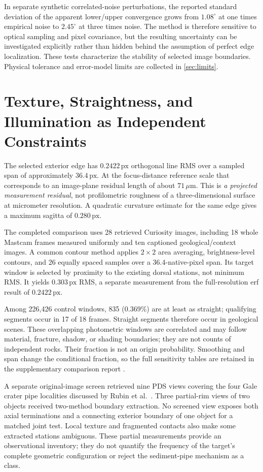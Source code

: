 \documentclass[11pt,letterpaper]{article}
\newcommand{\px}{\,\mathrm{px}}
\begin{document}
In separate synthetic correlated-noise perturbations, the reported standard deviation of the apparent lower/upper convergence grows from \(1.08^\circ\) at one times empirical noise to \(2.45^\circ\) at three times noise. The method is therefore sensitive to optical sampling and pixel covariance, but the resulting uncertainty can be investigated explicitly rather than hidden behind the assumption of perfect edge localization. These tests characterize the stability of selected image boundaries. Physical tolerance and error-model limits are collected in \cref{sec:limits}.

\section{Texture, Straightness, and Illumination as Independent Constraints}
\label{sec:comparisons}

The selected exterior edge has \(0.2422\px\) orthogonal line RMS over a sampled span of approximately \(36.4\px\). At the focus-distance reference scale that corresponds to an image-plane residual length of about \(71\,\mu\mathrm m\). This is \emph{a projected measurement residual}, not profilometric roughness of a three-dimensional surface at micrometer resolution. A quadratic curvature estimate for the same edge gives a maximum sagitta of \(0.280\px\).

The completed comparison uses 28 retrieved Curiosity images, including 18 whole Mastcam frames measured uniformly and ten captioned geological/context images. A common contour method applies $2\times2$ area averaging, brightness-level contours, and 26 equally spaced samples over a 36.4-native-pixel span. Its target window is selected by proximity to the existing dorsal stations, not minimum RMS. It yields $0.303\px$ RMS, a separate measurement from the full-resolution erf result of $0.2422\px$.

Among 226,426 control windows, 835 ($0.369\%$) are at least as straight; qualifying segments occur in 17 of 18 frames. Straight segments therefore occur in geological scenes. These overlapping photometric windows are correlated and may follow material, fracture, shadow, or shading boundaries; they are not counts of independent rocks. Their fraction is not an origin probability. Smoothing and span change the conditional fraction, so the full sensitivity tables are retained in the supplementary comparison report \cite{comparison2026}.

A separate original-image screen retrieved nine PDS views covering the four Gale crater pipe localities discussed by Rubin et al.\ \cite{rubin2017,rubin2017supp}. Three partial-rim views of two objects received two-method boundary extraction. No screened view exposes both axial terminations and a connecting exterior boundary of one object for a matched joint test. Local texture and fragmented contacts also make some extracted stations ambiguous. These partial measurements provide an observational inventory; they do not quantify the frequency of the target's complete geometric configuration or reject the sediment-pipe mechanism as a class.
\end{document}
